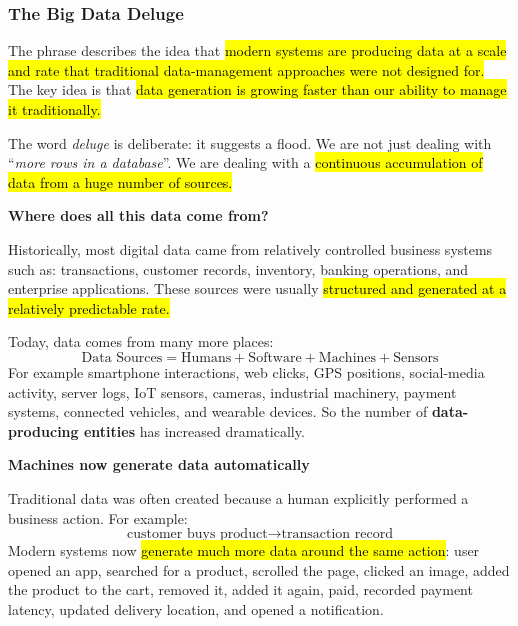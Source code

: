 \subsubsection{The Big Data Deluge}\label{subsubsec:big-data--big-data--big-data-landscape-and-the-data-driven-value-cycle--the-big-data-deluge}

The phrase  describes the idea that \hl{modern systems are producing data at a scale and rate that traditional data-management approaches were not designed for.} The key idea is that \hl{data generation is growing faster than our ability to manage it traditionally.}

\highspace
The word \emph{deluge} is deliberate: it suggests a flood. We are not just dealing with ``\emph{more rows in a database}''. We are dealing with a \hl{continuous accumulation of data from a huge number of sources.}

\highspace
\begin{flushleft}
    \textcolor{Green3}{ \textbf{Where does all this data come from?}}
\end{flushleft}
Historically, most digital data came from relatively controlled business systems such as: transactions, customer records, inventory, banking operations, and enterprise applications. These sources were usually \hl{structured and generated at a relatively predictable rate.}

\highspace
Today, data comes from many more places:
\begin{equation*}
    \text{Data Sources} = \text{Humans} + \text{Software} + \text{Machines} + \text{Sensors}
\end{equation*}
For example smartphone interactions, web clicks, GPS positions, social-media activity, server logs, IoT sensors, cameras, industrial machinery, payment systems, connected vehicles, and wearable devices. So the number of \textbf{data-\break producing entities} has increased dramatically.

\highspace
\begin{flushleft}
    \textcolor{Green3}{ \textbf{Machines now generate data automatically}}
\end{flushleft}
Traditional data was often created because a human explicitly performed a business action. For example:
\begin{equation*}
    \text{customer buys product}
    \rightarrow
    \text{transaction record}
\end{equation*}
Modern systems now \hl{generate much more data around the same action}:  user opened an app, searched for a product, scrolled the page, clicked an image, added the product to the cart, removed it, added it again, paid, recorded payment latency, updated delivery location, and opened a notification.

